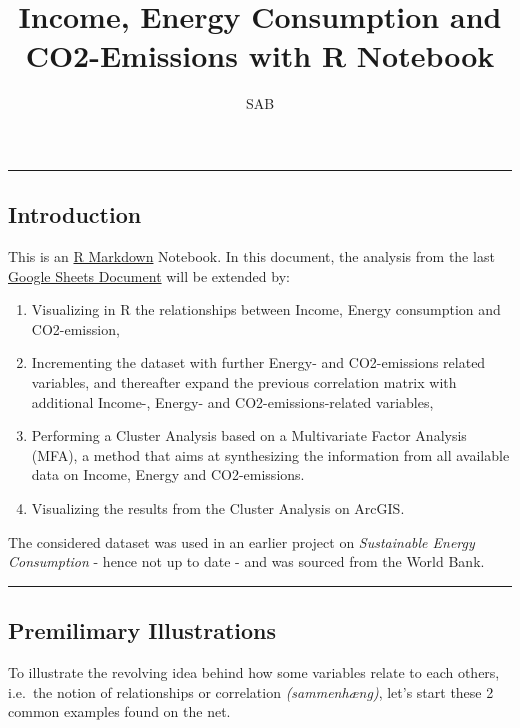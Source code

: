 \documentclass[]{article}
\title{Income, Energy Consumption and CO2-Emissions with R Notebook}
\author{SAB}
\date{}
\begin{document}
\maketitle

\begin{center}\rule{0.5\linewidth}{\linethickness}\end{center}

\subsection{Introduction}\label{introduction}

This is an \href{http://rmarkdown.rstudio.com}{R Markdown} Notebook. In
this document, the analysis from the last
\href{https://docs.google.com/spreadsheets/d/1NZpys5yniDyOuUPxV7JKWkcTP-FUZL1esZSvUitZPd0/edit?usp=sharing}{Google
Sheets Document} will be extended by:

\begin{enumerate}
\def\labelenumi{\arabic{enumi}.}
\item
  Visualizing in R the relationships between Income, Energy consumption
  and CO2-emission,
\item
  Incrementing the dataset with further Energy- and CO2-emissions
  related variables, and thereafter expand the previous correlation
  matrix with additional Income-, Energy- and CO2-emissions-related
  variables,
\item
  Performing a Cluster Analysis based on a Multivariate Factor Analysis
  (MFA), a method that aims at synthesizing the information from all
  available data on Income, Energy and CO2-emissions.
\item
  Visualizing the results from the Cluster Analysis on ArcGIS.
\end{enumerate}

The considered dataset was used in an earlier project on
\emph{Sustainable Energy Consumption} - hence not up to date - and was
sourced from the World Bank.

\begin{center}\rule{0.5\linewidth}{\linethickness}\end{center}

\subsection{Premilimary Illustrations}\label{premilimary-illustrations}

To illustrate the revolving idea behind how some variables relate to
each others, i.e.~the notion of relationships or correlation
\emph{(sammenhæng)}, let's start these 2 common examples found on the
net.
\end{document}

